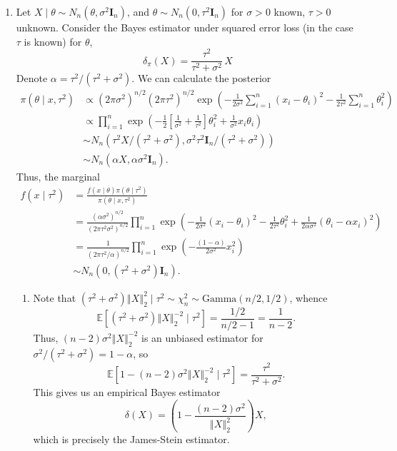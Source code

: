 \documentclass[11pt]{article}
\newcommand{\norm}[1]{\left\Vert #1 \right\Vert}
\newcommand{\EE}{\mathbb{E}}
\begin{document}
\begin{enumerate}
        \item Let $X \mid \theta \sim N_n(\theta, \sigma^2 \bm{I}_n)$, and
        $\theta \sim N_n(0, \tau^2 \bm{I}_n)$ for $\sigma > 0$ known, $\tau >
        0$ unknown.
        Consider the Bayes estimator under squared error loss (in the case
        $\tau$ is known) for $\theta$, \[
            \delta_\pi(X) = \frac{\tau^2}{\tau^2 + \sigma^2}\, X
        \] Denote $\alpha = \tau^2 / (\tau^2 + \sigma^2)$.
        We can calculate the posterior \begin{align*}
            \pi(\theta \mid x, \tau^2)
                &\propto (2\pi \sigma^2)^{n / 2} (2\pi \tau^2)^{n / 2}\exp\left(-\frac{1}{2\sigma^2}\sum_{i = 1}^n (x_i - \theta_i)^2 - \frac{1}{2\tau^2} \sum_{i = 1}^n \theta_i^2\right) \\
                &\propto \prod_{i = 1}^n \exp\left(-\frac{1}{2}\left[\frac{1}{\sigma^2} + \frac{1}{\tau^2}\right]\theta_i^2 + \frac{1}{\sigma^2} x_i \theta_i\right) \\
                &\sim N_n(\tau^2 X / (\tau^2 + \sigma^2), \sigma^2\tau^2 \bm{I}_n / (\tau^2 + \sigma^2)) \\
                &\sim N_n(\alpha X, \alpha \sigma^2 \bm{I}_n).
        \end{align*}
        Thus, the marginal \begin{align*}
            f(x \mid \tau^2)
                &= \frac{f(x\mid \theta)\pi(\theta\mid \tau^2)}{\pi(\theta\mid x, \tau^2)} \\
                &= \frac{(\alpha\sigma^2)^{n / 2}}{(2\pi\tau^2\sigma^2)^{n / 2}}\prod_{i = 1}^n \exp\left(-\frac{1}{2\sigma^2} (x_i - \theta_i)^2 -\frac{1}{2\tau^2} \theta_i^2 + \frac{1}{2\alpha\sigma^2} (\theta_i - \alpha x_i)^2\right) \\
                &= \frac{1}{(2\pi \tau^2 / \alpha)^{n / 2}} \prod_{i = 1}^n \exp\left(-\frac{(1 - \alpha)}{2\sigma^2}x_i^2\right) \\
                &\sim N_n(0, (\tau^2 +\sigma^2) \bm{I}_n).
        \end{align*}

        \begin{enumerate}
            \item Note that $(\tau^2 + \sigma^2) \norm{X}_2^2 \mid
            \tau^2 \sim \chi_n^2 \sim \text{Gamma}(n / 2, 1 / 2)$, whence \[
                \EE\left[(\tau^2 + \sigma^2)\norm{X}_2^{-2} \mid \tau^2\right]
                    = \frac{1 / 2}{n / 2 - 1}
                    = \frac{1}{n - 2}.
            \] Thus, $(n - 2)\sigma^2 \norm{X}_2^{-2}$ is an unbiased estimator
            for $\sigma^2 / (\tau^2 + \sigma^2) = 1 - \alpha$, so \[
                \EE[1 - (n - 2)\sigma^2 \norm{X}_2^{-2} \mid \tau^2]
                    = \frac{\tau^2}{\tau^2 + \sigma^2}.
            \] This gives us an empirical Bayes estimator \[
                \delta(X) = \left(1 - \frac{(n - 2)\sigma^2}{\norm{X}_2^2}\right) X,
            \] which is precisely the James-Stein estimator.



\end{enumerate}
\end{enumerate}
\end{document}
